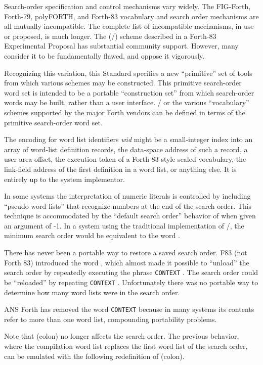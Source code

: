 Search-order specification and control mechanisms vary widely. The
FIG-Forth, Forth-79, polyFORTH, and Forth-83 vocabulary and search
order mechanisms are all mutually incompatible. The complete list of
incompatible mechanisms, in use or proposed, is much longer. The
(/) scheme described in a Forth-83 Experimental
Proposal has substantial community support. However, many consider it
to be fundamentally flawed, and oppose it vigorously.

Recognizing this variation, this Standard specifies a new ``primitive''
set of tools from which various schemes may be constructed. This
primitive search-order word set is intended to be a portable
``construction set'' from which search-order words may be built,
rather than a user interface. / or the various
``vocabulary'' schemes supported by the major Forth vendors can be
defined in terms of the primitive search-order word set.

The encoding for word list identifiers \emph{wid} might be a
small-integer index into an array of word-list definition records, the
data-space address of such a record, a user-area offset, the execution
token of a Forth-83 style sealed vocabulary, the link-field address of
the first definition in a word list, or anything else. It is entirely
up to the system implementor.

In some systems the interpretation of numeric literals is controlled
by including ``pseudo word lists'' that recognize numbers at the end
of the search order. This technique is accommodated by the ``default
search order'' behavior of  when given an argument of
-1. In a system using the traditional implementation of
/, the minimum search order would be equivalent
to the word .

There has never been a portable way to restore a saved search order.
F83 (not Forth 83) introduced the word , which almost
made it possible to ``unload'' the search order by repeatedly executing
the phrase \texttt{CONTEXT}  . The search
order could be ``reloaded'' by repeating  \texttt{CONTEXT}
\word{!}. Unfortunately there was no portable way to determine
how many word lists were in the search order.

ANS Forth has removed the word \texttt{CONTEXT} because in many systems
its contents refer to more than one word list, compounding portability
problems.

Note that \word{:} (colon) no longer affects the search order. The
previous behavior, where the compilation word list replaces the first
word list of the search order, can be emulated with the following
redefinition of \word{:} (colon).


